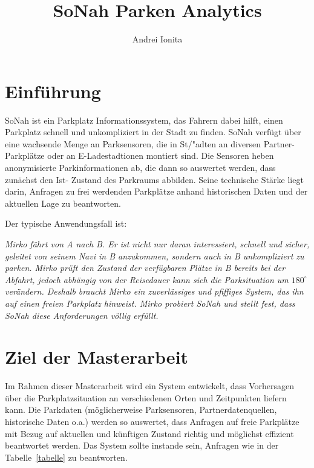 \documentclass{article}
\begin{document}
\title{SoNah Parken Analytics}
\author{Andrei Ionita}

\maketitle

\section{Einf\"uhrung}
SoNah ist ein Parkplatz Informationssystem, das Fahrern dabei hilft, einen Parkplatz schnell und unkompliziert in der Stadt zu finden. SoNah verf\"ugt \"uber eine wachsende Menge an Parksensoren, die in St/"adten an diversen Partner-Parkpl\"atze oder an E-Ladestadtionen montiert sind. Die Sensoren heben anonymisierte Parkinformationen ab, die dann so auswertet werden, dass zun\"achst den Ist- Zustand des Parkraums abbilden. Seine technische St\"arke liegt darin, Anfragen zu frei werdenden Parkpl\"atze anhand historischen Daten und der aktuellen Lage zu beantworten.

\vspace{2mm}
Der typische Anwendungsfall ist:

\vspace{2mm}
\textit{Mirko f\"ahrt von A nach B. Er ist nicht nur daran interessiert, schnell und sicher, geleitet von seinem Navi in B anzukommen, sondern auch in B unkompliziert zu parken. Mirko pr\"uft den Zustand der verf\"ugbaren Pl\"atze in B bereits bei der Abfahrt, jedoch abh\"angig von der Reisedauer kann sich die Parksituation um $180^\circ$ ver\"andern. Deshalb braucht Mirko ein zuverl\"assiges und pfiffiges System, das ihn auf einen freien Parkplatz hinweist. Mirko probiert SoNah und stellt fest, dass SoNah diese Anforderungen v\"ollig erf\"ullt.}

\section{Ziel der Masterarbeit}
Im Rahmen dieser Masterarbeit wird ein System entwickelt, dass Vorhersagen \"uber die Parkplatzsituation an verschiedenen Orten und Zeitpunkten liefern kann. Die Parkdaten (m\"oglicherweise Parksensoren, Partnerdatenquellen, historische Daten o.a.) werden so auswertet, dass Anfragen auf freie Parkpl\"atze mit Bezug auf aktuellen und k\"unftigen Zustand richtig und m\"oglichst effizient beantwortet werden. Das System sollte instande sein, Anfragen wie in der Tabelle~\ref{tabelle} zu beantworten.
\end{document}
